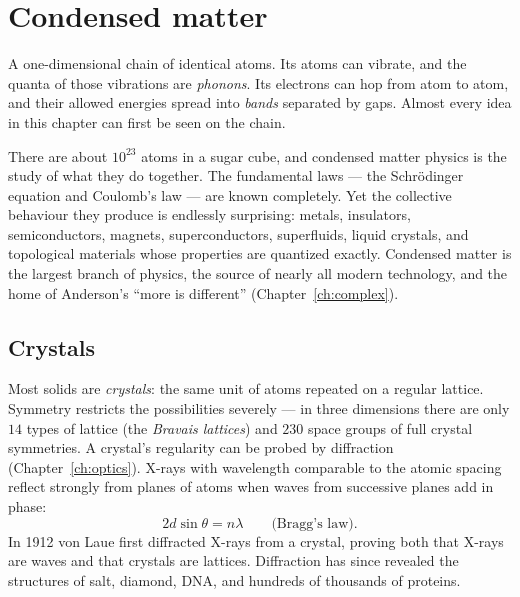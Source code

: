 \chapter{Condensed matter}
\label{ch:condmat}



\begin{prototype}
A one-dimensional chain of identical atoms. Its atoms can vibrate, and the quanta of those vibrations are \emph{phonons}. Its electrons can hop from atom to atom, and their allowed energies spread into \emph{bands} separated by gaps. Almost every idea in this chapter can first be seen on the chain.
\end{prototype}

There are about $10^{23}$ atoms in a sugar cube, and condensed matter physics is the study of what they do together. The fundamental laws --- the Schr\"odinger equation and Coulomb's law --- are known completely. Yet the collective behaviour they produce is endlessly surprising: metals, insulators, semiconductors, magnets, superconductors, superfluids, liquid crystals, and topological materials whose properties are quantized exactly. Condensed matter is the largest branch of physics, the source of nearly all modern technology, and the home of Anderson's ``more is different'' (Chapter~\ref{ch:complex}).

\section{Crystals}

Most solids are \emph{crystals}: the same unit of atoms repeated on a regular lattice. Symmetry restricts the possibilities severely --- in three dimensions there are only $14$ types of lattice (the \emph{Bravais lattices}) and $230$ space groups of full crystal symmetries. A crystal's regularity can be probed by diffraction (Chapter~\ref{ch:optics}). X-rays with wavelength comparable to the atomic spacing reflect strongly from planes of atoms when waves from successive planes add in phase:
\[
  2d\sin\theta = n\lambda \qquad\text{(Bragg's law)}.
\]
In 1912 von Laue first diffracted X-rays from a crystal, proving both that X-rays are waves and that crystals are lattices. Diffraction has since revealed the structures of salt, diamond, DNA, and hundreds of thousands of proteins.

